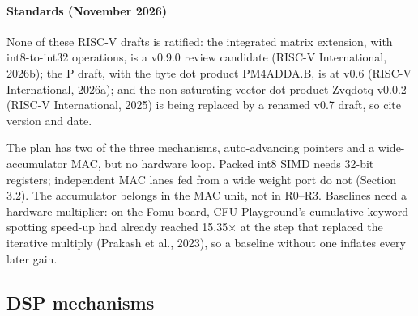 \paragraph{Standards (November 2026)} None of these RISC-V drafts is ratified: the integrated matrix extension, with int8-to-int32 operations, is a v0.9.0 review candidate (RISC-V International, 2026b); the P draft, with the byte dot product PM4ADDA.B, is at v0.6 (RISC-V International, 2026a); and the non-saturating vector dot product Zvqdotq v0.0.2 (RISC-V International, 2025) is being replaced by a renamed v0.7 draft, so cite version and date.

\begin{forls}[For LS]
The plan has two of the three mechanisms, auto-advancing pointers and a wide-accumulator MAC, but no hardware loop. Packed int8 SIMD needs 32-bit registers; independent MAC lanes fed from a wide weight port do not (Section 3.2). The accumulator belongs in the MAC unit, not in R0–R3. Baselines need a hardware multiplier: on the Fomu board, CFU Playground's cumulative keyword-spotting speed-up had already reached 15.35× at the step that replaced the iterative multiply (Prakash et al., 2023), so a baseline without one inflates every later gain.

\end{forls}
\subsection{DSP mechanisms}

